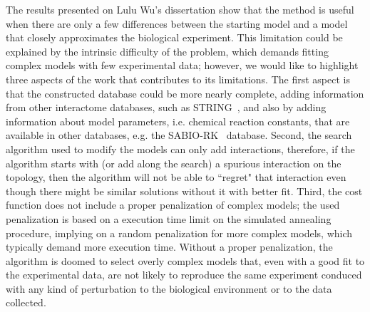 The results presented on Lulu Wu's dissertation show that the method is 
useful when there are only a few differences between the starting model
and a model that closely approximates the biological experiment. This
limitation could be explained by the intrinsic difficulty of the 
problem, which demands fitting complex models with few experimental 
data; however, we would like to highlight three aspects of the work that 
contributes to its limitations. The first aspect is that the constructed 
database could be more nearly complete, adding information from other 
interactome databases, such as STRING~\cite{Szklarczyk2010}, and also by 
adding information about model parameters, i.e. chemical reaction 
constants, that are available in other databases, e.g. the 
SABIO-RK~\cite{Wittig2011} database. Second, the search algorithm used
to modify the models can only add interactions, therefore, if the 
algorithm starts with (or add along the search) a spurious interaction 
on the topology, then the algorithm will not be able to ``regret" that 
interaction even though there might be similar solutions without it with 
better fit. Third, the cost function does not include a proper 
penalization of complex models; the used penalization is based on a 
execution time limit on the simulated annealing procedure, implying on a 
random penalization for more complex models, which typically demand more 
execution time. Without a proper penalization, the algorithm is doomed 
to select overly complex models that, even with a good fit to the 
experimental data, are not likely to reproduce the same experiment
conduced with any kind of perturbation to the biological environment or 
to the data collected.

